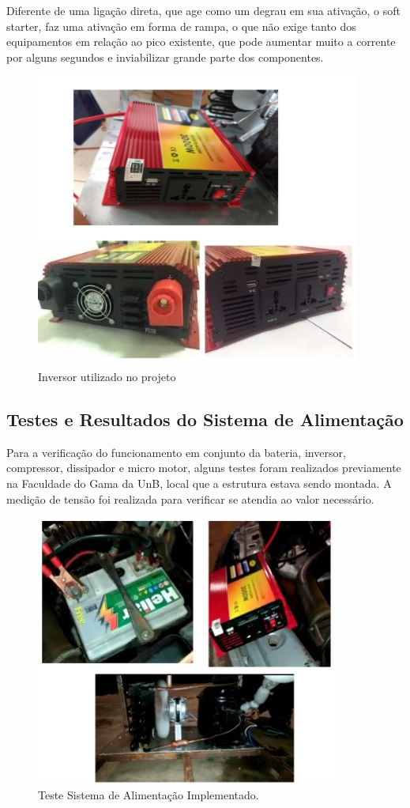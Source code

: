Diferente de uma ligação direta, que age como um degrau em sua ativação, o soft starter,  faz uma ativação em forma de rampa, o que não exige tanto dos equipamentos em relação ao pico existente, que pode aumentar muito a corrente por alguns segundos e inviabilizar grande parte dos componentes.
			\begin{figure}[H]
				\begin{center}
					\includegraphics[scale = 0.75]{figuras/Inversor_Implementado}
					\caption{Inversor utilizado no projeto}
				\end{center}
			\end{figure}
\subsection{Testes e Resultados do Sistema de Alimentação}
Para a verificação do funcionamento em conjunto da bateria, inversor, compressor, dissipador e micro motor, alguns testes foram realizados previamente na Faculdade do Gama da UnB, local que a estrutura estava sendo montada. A medição de tensão foi realizada para verificar se atendia ao valor necessário.

			\begin{figure}[H]
				\begin{center}
					\includegraphics[scale = 0.75]{figuras/Implementacao_Inversor}
					\caption{Teste Sistema de Alimentação Implementado.}
				\end{center}
			\end{figure}
			
